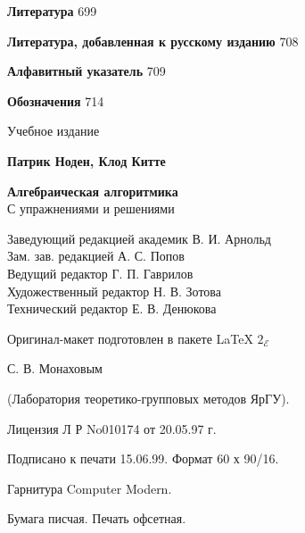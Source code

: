 \documentclass{mai_book}
\begin{document}
{\noindent\textbf{Литература} \dotfill \hspace{0.5cm} 699 

\noindent\textbf{Литература, добавленная к русскому изданию} \dotfill \hspace{0.5cm} 708 

\noindent\textbf{Алфавитный указатель} \dotfill \hspace{0.5cm} 709

 \noindent\textbf{Обозначения} \dotfill \hspace{0.5cm} 714

 \newpage
 \thispagestyle{empty}
 	\hfill \break
 	\hfill \break
 	\hfill \break
 	\hfill \break
 	\hfill \break
 	\hfill \break
 	\hfill \break
 	\begin{center}
 		 	Учебное издание
 	\end{center}
 	\hfill \break
 	\begin{center}
 		\textbf{Патрик Ноден, Клод Китте}
 	\end{center}
 	\begin{center}
 		\textbf{Алгебраическая алгоритмика} \\
 		С упражнениями и решениями
 	\end{center}
 	 
 	\begin{center}
 			Заведующий редакцией академик В. И. Арнольд \\
 		Зам. зав. редакцией А. С. Попов \\
 		Ведущий редактор Г. П. Гаврилов \\
 		Художественный редактор Н. В. Зотова \\
 		Технический редактор Е. В. Денюкова
 	\end{center}
 
 \begin{center}
  	Оригинал-макет подготовлен в пакете \LaTeX $ $  $2_{\mathcal{E}}$
 
 С. В. Монаховым
 
 (Лаборатория теоретико-групповых методов ЯрГУ).	
 \end{center}

 	\begin{center}
 		 	Лицензия Л Р No010174 от 20.05.97 г.
 		
 		Подписано к печати 15.06.99. Формат 60 х 90/16.
 		
 		 Гарнитура Computer Modern.
 		
 		Бумага писчая. Печать офсетная.
 		

\end{center}}
\end{document}

